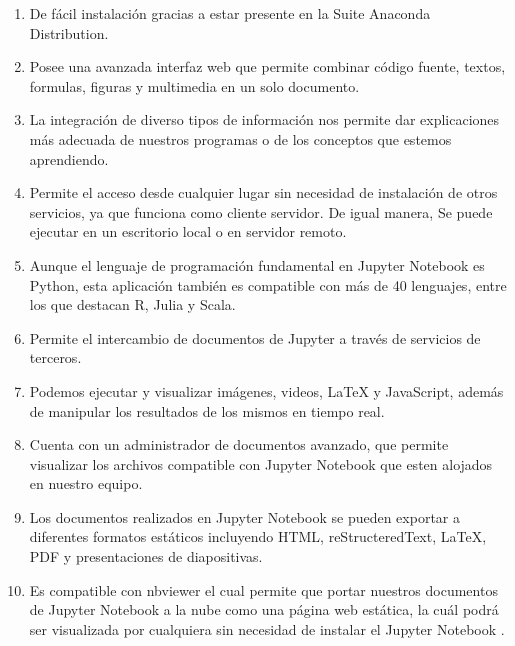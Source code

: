 \documentclass[12pt,a4paper]{article}
\begin{document}
\begin{enumerate}

\item De fácil instalación gracias a estar presente en la Suite Anaconda Distribution.

\item Posee una avanzada interfaz web que permite combinar código fuente, textos, formulas, figuras y multimedia en un solo documento.

\item La integración de diverso tipos de información nos permite dar explicaciones más adecuada de nuestros programas o de los conceptos que estemos aprendiendo.

\item Permite el acceso desde cualquier lugar sin necesidad de instalación de otros servicios, ya que funciona como cliente servidor. De igual manera, Se puede ejecutar en un escritorio local o en servidor remoto.

\item Aunque el lenguaje de programación fundamental en Jupyter Notebook es Python, esta aplicación también es compatible con más de 40 lenguajes, entre los que destacan R, Julia y Scala.

\item Permite el intercambio de documentos de Jupyter a través de servicios de terceros.

\item Podemos ejecutar y visualizar imágenes, videos, LaTeX y JavaScript, además de manipular los resultados de los mismos en tiempo real.

\item Cuenta con un administrador de documentos avanzado, que permite visualizar los archivos compatible con Jupyter Notebook que esten alojados en nuestro equipo.

\item Los documentos realizados en Jupyter Notebook se pueden exportar a diferentes formatos estáticos incluyendo HTML, reStructeredText, LaTeX, PDF y presentaciones de diapositivas.

\item Es compatible con nbviewer el cual permite que portar nuestros documentos de Jupyter Notebook a la nube como una página web estática, la cuál podrá ser visualizada por cualquiera sin necesidad de instalar el Jupyter Notebook .

\end{enumerate}
\end{document}
